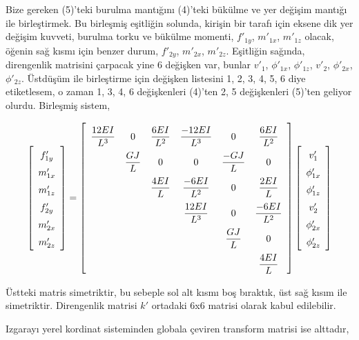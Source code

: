 \documentclass[12pt,fleqn]{article}\usepackage{../../common}
\begin{document}
Bize gereken (5)'teki burulma mantığını (4)'teki bükülme ve yer değişim mantığı
ile birleştirmek. Bu birleşmiş eşitliğin solunda, kirişin bir tarafı için eksene
dik yer değişim kuvveti, burulma torku ve bükülme momenti, $f'_{1y}$, $m'_{1x}$,
$m'_{1z}$ olacak, öğenin sağ kısmı için benzer durum, $f'_{2y}$, $m'_{2x}$,
$m'_{2z}$.  Eşitliğin sağında, direngenlik matrisini çarpacak yine 6 değişken
var, bunlar $v'_1$, $\phi'_{1x}$, $\phi'_{1z}$, $v'_2$, $\phi'_{2x}$,
$\phi'_{2z}$. Üstdüşüm ile birleştirme için değişken listesini 1, 2, 3, 4, 5, 6
diye etiketlesem, o zaman 1, 3, 4, 6 değişkenleri (4)'ten 2, 5 değişkenleri
(5)'ten geliyor olurdu. Birleşmiş sistem,

$$
\renewcommand*{\arraystretch}{1.5}
\left[\begin{array}{c}
f'_{1y} \\ m'_{1x} \\ m'_{1z} \\ f'_{2y} \\ m'_{2x} \\ m'_{2z} 
\end{array}\right] =
\renewcommand*{\arraystretch}{2.2}
\left[\begin{array}{cccccc}
\dfrac{12 EI}{L^3} & 0 & \dfrac{6 EI}{L^2} & \dfrac{-12EI}{L^3} & 0 & \dfrac{6EI}{L^2}\\
 & \dfrac{GJ}{L} & 0 & 0 & \dfrac{-GJ}{L} & 0 \\
 & & \dfrac{4EI}{L} & \dfrac{-6EI}{L^2} & 0 & \dfrac{2EI}{L} \\
 & & & \dfrac{12EI}{L^3} & 0 & \dfrac{-6EI}{L^2} \\
 & & & & \dfrac{GJ}{L} & 0 \\
 & & & & & \dfrac{4EI}{L} 
\end{array}\right]
\renewcommand*{\arraystretch}{1.5}
\left[\begin{array}{c}
v'_1 \\ \phi'_{1x} \\ \phi'_{1z} \\ v'_2 \\ \phi'_{2x} \\ \phi'_{2z}
\end{array}\right]
$$

Üstteki matris simetriktir, bu sebeple sol alt kısmı boş bıraktık, üst sağ kısım
ile simetriktir. Direngenlik matrisi $k'$ ortadaki 6x6 matrisi olarak kabul
edilebilir.

Izgarayı yerel kordinat sisteminden globala çeviren transform matrisi ise
alttadır,
\end{document}
